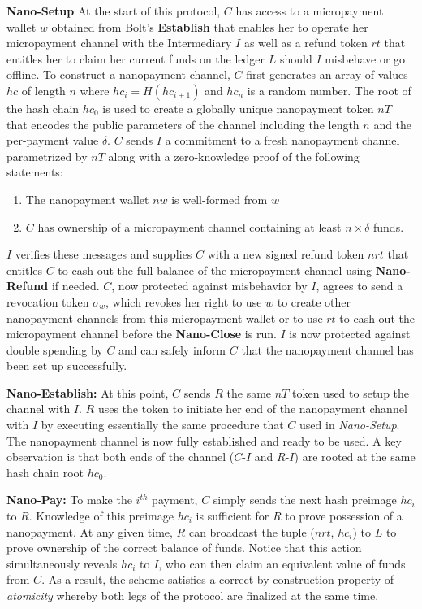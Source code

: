 \medskip \noindent\textbf{Nano-Setup} At the start of this protocol, $C$ has access to a micropayment wallet $w$ obtained from Bolt's \textbf{Establish} that enables her to operate her micropayment channel with the Intermediary $I$ as well as a refund token $rt$ that entitles her to claim her current funds on the ledger $L$ should $I$ misbehave or go offline.
To construct a nanopayment channel, $C$ first generates an array of values $hc$ of length $n$ where $hc_i = H(hc_{i+1})$ and $hc_n$ is a random number.
The root of the hash chain $hc_0$ is used to create a globally unique nanopayment token $nT$ that encodes the public parameters of the channel including the length $n$ and the per-payment value $\delta$.
$C$ sends $I$ a commitment to a fresh nanopayment channel parametrized by $nT$ along with a zero-knowledge proof of the following statements:

\begin{enumerate}
\item The nanopayment wallet $nw$ is well-formed from $w$
\item $C$ has ownership of a micropayment channel containing at least $n \times \delta$ funds.
\end{enumerate}

$I$ verifies these messages and supplies $C$ with a new signed refund token $nrt$ that entitles $C$ to cash out the full balance of the micropayment channel using \textbf{Nano-Refund} if needed.
$C$, now protected against misbehavior by $I$, agrees to send a revocation token $\sigma_w$, which revokes her right to use $w$ to create other nanopayment channels from this micropayment wallet or to use $rt$ to cash out the micropayment channel before the \textbf{Nano-Close} is run.
$I$ is now protected against double spending by $C$ and can safely inform $C$ that the nanopayment channel has been set up successfully.

\medskip \noindent\textbf{Nano-Establish:} At this point, $C$ sends $R$ the same $nT$ token used to setup the channel with $I$.
$R$ uses the token to initiate her end of the nanopayment channel with $I$ by executing essentially the same procedure that $C$ used in \emph{Nano-Setup}.
The nanopayment channel is now fully established and ready to be used.
A key observation is that both ends of the channel ($C$-$I$ and $R$-$I$) are rooted at the same hash chain root $hc_0$.

\medskip \noindent\textbf{Nano-Pay:} To make the $i^{th}$ payment, $C$ simply sends the next hash preimage $hc_i$ to $R$.
Knowledge of this preimage $hc_i$ is sufficient for $R$ to prove possession of a nanopayment.
At any given time, $R$ can broadcast the tuple ($nrt$, $hc_i$) to $L$ to prove ownership of the correct balance of funds.
Notice that this action simultaneously reveals $hc_i$ to $I$, who can then claim an equivalent value of funds from $C$.
As a result, the scheme satisfies a correct-by-construction property of \emph{atomicity} whereby both legs of the protocol are finalized at the same time.

